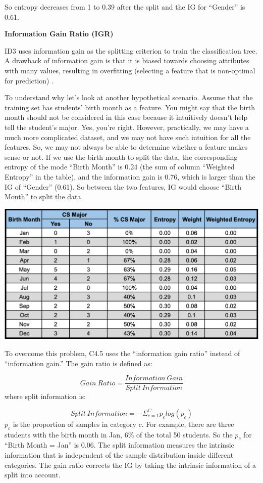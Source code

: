 \documentclass[
  12pt,
]{krantz}
\begin{document}
So entropy decreases from 1 to 0.39 after the split and the IG for ``Gender'' is 0.61.

\textbf{Information Gain Ratio (IGR)}

ID3 uses information gain as the splitting criterion to train the classification tree. A drawback of information gain is that it is biased towards choosing attributes with many values, resulting in overfitting (selecting a feature that is non-optimal for prediction) \citep{HSSINA2014}.

To understand why let's look at another hypothetical scenario. Assume that the training set has students' birth month as a feature. You might say that the birth month should not be considered in this case because it intuitively doesn't help tell the student's major. Yes, you're right. However, practically, we may have a much more complicated dataset, and we may not have such intuition for all the features. So, we may not always be able to determine whether a feature makes sense or not. If we use the birth month to split the data, the corresponding entropy of the mode ``Birth Month'' is 0.24 (the sum of column ``Weighted Entropy'' in the table), and the information gain is 0.76, which is larger than the IG of ``Gender'' (0.61). So between the two features, IG would choose ``Birth Month'' to split the data.

\includegraphics{images/infogainratioexp.png}

To overcome this problem, C4.5 uses the ``information gain ratio'' instead of ``information gain.'' The gain ratio is defined as:

\[Gain\ Ratio = \frac{Information\ Gain}{Split\ Information}\]
where split information is:

\[Split\ Information = -\Sigma_{c = 1}^{C}p_clog(p_c)\]
\(p_c\) is the proportion of samples in category \(c\). For example, there are three students with the birth month in Jan, 6\% of the total 50 students. So the \(p_c\) for ``Birth Month = Jan'' is 0.06. The split information measures the intrinsic information that is independent of the sample distribution inside different categories. The gain ratio corrects the IG by taking the intrinsic information of a split into account.
\end{document}
